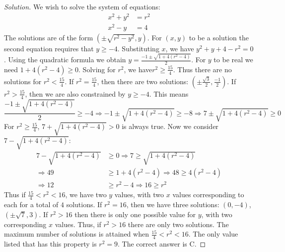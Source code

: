\documentclass[crop=false,class=article,oneside]{standalone}
\begin{document}
        \begin{proof}[Solution]
            We wish to solve the system of equations:
            \begin{align*}
                x^{2}+y^{2}&=r^{2}\\
                x^{2}-y&=4
            \end{align*}
            The solutions are of the form $(\pm \sqrt{r^2-y^2},y)$.
            For $(x,y)$ to be a solution
            the second equation requires
            that $y\geq -4$. Substituting $x$, we have
            $y^{2}+y+4-r^{2}=0$. Using the quadratic formula
            we obtain
            $y=\frac{-1\pm\sqrt{1+4(r^{2}-4)}}{2}$.
            For $y$ to be real
            we need $1+4(r^{2}-4)\geq 0$. Solving for $r^2$,
            we have$r^{2}\geq\frac{15}{4}$.
            Thus there are no solutions for
            $r^{2}<\frac{15}{4}$. If $r^{2}=\frac{15}{4}$,
            then there are two solutions:
            $(\pm\frac{\sqrt{3}}{2},\frac{-1}{2})$. If
            $r^{2}>\frac{15}{4}$, then we are
            also constrained by $y\geq-4$. This means 
            \begin{equation*}
                \frac{-1\pm\sqrt{1+4(r^{2}-4)}}{2}\geq-4
                \Rightarrow -1\pm\sqrt{1+4(r^{2}-4)}\geq-8
                \Rightarrow 7\pm\sqrt{1+4(r^{2}-4)}\geq 0
            \end{equation*}
            For $r^2 \geq \frac{15}{4}$, $7+\sqrt{1+4(r^2-4)}>0$
            is always true. Now we consider $7-\sqrt{1+4(r^2-4)}:$
            \begin{align*}
                7-\sqrt{1+4(r^{2}-4)}&\geq 0
                \Rightarrow 7\geq\sqrt{1+4(r^{2}-4)}\\
                \Rightarrow 49&\geq 1+4(r^{2}-4)\Rightarrow
                48\geq 4(r^{2}-4)\\
                \Rightarrow 12&\geq r^{2}-4\Rightarrow 16\geq r^{2}
            \end{align*}
            Thus if $\frac{15}{4}<r^2<16$, we have two
            $y$ values, with two $x$ values corresponding
            to each for a total of $4$ solutions.
            If $r^2 = 16$, then we have three solutions:
            $(0,-4)$, $(\pm \sqrt{7},3)$. If $r^2>16$
            then there is only one possible value for
            $y$, with two corresponding $x$ values.
            Thus, if $r^2>16$ there are only two solutions.
            The maximum number of solutions is attained
            when $\frac{15}{4} < r^2 <16$. The only value
            listed that has this property is $r^2 = 9$.
            The correct answer is C.
        \end{proof}
\end{document}
